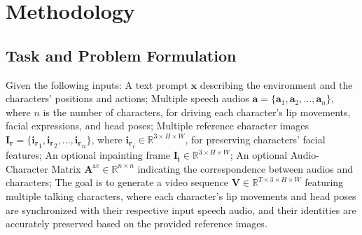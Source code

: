 
\section{Methodology}



\subsection{Task and Problem Formulation}
Given the following inputs:
A text prompt $\mathbf{x}$ describing the environment and the characters’ positions and actions; 
Multiple speech audios $\mathbf{a} = \{\mathbf{a}_1, \mathbf{a}_2, \dots, \mathbf{a}_n\}$, where $n$ is the number of characters, for driving each character's lip movements, facial expressions, and head poses; 
Multiple reference character images $\mathbf{I_r} = \{\mathbf{i_r}_1, \mathbf{i_r}_2, \dots, \mathbf{i_r}_n\}$, where $\mathbf{i_r}_i \in \mathbb{R}^{3 \times H \times W}$, for preserving characters' facial features; 
An optional inpainting frame $\mathbf{I_i} \in \mathbb{R}^{3 \times H \times W}$; 
An optional Audio-Character Matrix $\mathbf{A}^{\text{ac}} \in \mathbb{R}^{n \times n}$ indicating the correspondence between audios and characters; 
The goal is to generate a video sequence $\mathbf{V} \in \mathbb{R}^{T \times 3 \times H \times W}$ featuring multiple talking characters, where each character's lip movements and head poses are synchronized with their respective input speech audio, and their identities are accurately preserved based on the provided reference images.


